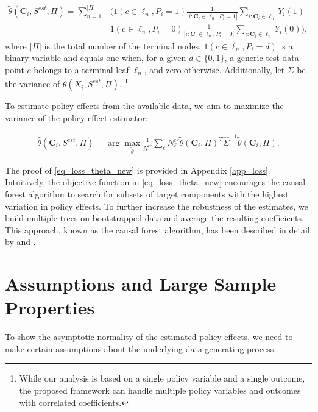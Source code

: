 \documentclass[12pt]{article}
\begin{document}
\begin{align} 
    \widetilde{\theta}(\mathbf{C}_i, S^{est}, \Pi)  = \nonumber \sum_{n=1}^{|\Pi|} & \bigg( 1(c \in \ell_n, P_i = 1)\frac{1}{|i: \mathbf{C}_i \in \ell_n, P_i = 1|}\sum_{i: \mathbf{C}_i \in \ell_n}Y_i(1) - \\
    &1(c \in \ell_n, P_i = 0)\frac{1}{|i: \mathbf{C}_i \in \ell_n, P_i = 0|}\sum_{i: \mathbf{C}_i \in \ell_n}Y_i(0)\bigg),
\end{align}  
where $|\Pi|$ is the total number of the terminal nodes. $1(c \in \ell_n, P_i = d)$ is a binary variable and equals one when, for a given $d \in \{0, 1\}$,  a generic test data point $c$ belongs to a terminal leaf $\ell_n$, and zero otherwise.  Additionally, let $\Sigma$ be the variance of $\widetilde{\theta}(X_i, S^{est}, \Pi)$. \footnote{While our analysis is based on a single policy variable and a single outcome, the proposed framework can handle multiple policy variables and outcomes with correlated coefficients.  } 

To estimate policy effects from the available data, we aim to maximize the variance of the policy effect estimator:

\begin{align} \label{eq_loss_theta_new}
    \hat{\theta}(\mathbf{C}_i, S^{est}, \Pi) = \arg\max_{\widetilde{\theta}} \frac{1}{N^{tr}} \sum_{\ell} N^{tr}_{\ell}\widetilde{\theta}(\mathbf{C}_i, \Pi)^{T}\widehat{\Sigma}^{-1}\widetilde{\theta}(\mathbf{C}_i, \Pi).
\end{align}

The proof of \eqref{eq_loss_theta_new} is provided in Appendix \ref{app_loss}. Intuitively, the objective function in \eqref{eq_loss_theta_new} encourages the causal forest algorithm to search for subsets of target components with the highest variation in policy effects. To further increase the robustness of the estimates, we build multiple trees on bootstrapped data and average the resulting coefficients. This approach, known as the causal forest algorithm, has been described in detail by \cite{athey2016recursive} and \cite{wager2018estimation}.




\section{Assumptions and Large Sample Properties}
To show the asymptotic normality of the estimated policy effects, we need to make certain assumptions about the underlying data-generating process.
\end{document}
